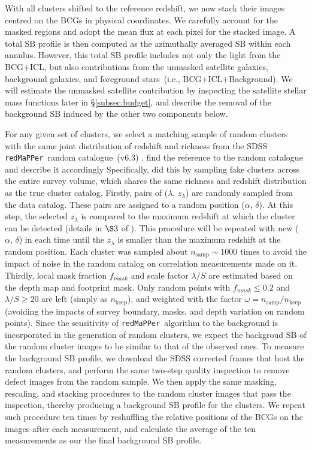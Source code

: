 \documentclass[fleqn,usenatbib]{mnras}
\newcommand\ying[1]{{\color{red} {#1}}}
\newcommand\xkchen[1]{{\color{cyan} {#1}}}
\newcommand\redmapper{\texttt{redMaPPer}}
\begin{document}
With all clusters shifted to the reference redshift, we now stack their
images centred on the BCGs in physical coordinates. We carefully account
for the masked regions and adopt the mean flux at each pixel for the
stacked image. A total SB profile is then computed as the azimuthally
averaged SB within each annulus. However, this total SB profile includes
not only the light from the BCG+ICL, but also contributions from the
unmasked satellite galaxies, background galaxies, and foreground
stars~(i.e., BCG+ICL+Background). We will estimate the unmasked satellite
contribution by inspecting the satellite stellar mass functions later in
\S\ref{subsec:budget}, and describe the removal of the background SB
induced by the other two components below.



For any given set of clusters, we select a matching sample of random
clusters with the same joint distribution of redshift and richness from the
SDSS \redmapper~random catalogue~(v6.3) \xkchen{\citep{Rykoff2016}}.\ying{find the reference to the
random catalogue and describe it accordingly} \xkchen{Specifically, \citep{Rykoff2016} did this by sampling fake clusters across the entire survey volume, which shares the same richness and redshift distribution as the true cluster catalog. Firstly, pairs of {($\lambda,\,z_{\lambda}$)} are randomly sampled from the data catalog. These pairs are assigned to a random position ($\alpha,\,\delta$). At this step, the selected $z_{\lambda}$ is compared to the maximum redshift at which the cluster can be detected (details in $\S3$ of \citep{Rykoff2016}). This procedure will be repeated with new ($\alpha,\,\delta$) in each time until the $z_{\lambda}$ is smaller than the maximum redshift at the random position. Each cluster was sampled about $n_{\mathrm{samp}}{\sim}1000$ times to avoid the impact of noise in the random catalog on correlation measurements made on it. Thirdly, local mask fraction $f_{mask}$ and scale factor $\lambda / S$ are estimated based on the depth map and footprint mask. Only random points with $f_{mask}\leq0.2$ and $\lambda / S \geq20$ are left (simply as $n_{\mathrm{keep}}$), and weighted with the factor $\omega=n_{\mathrm{samp}}/n_{\mathrm{keep}}$ (avoiding the impacts of survey boundary, masks, and depth variation on random points).}
Since the sensitivity of \redmapper~algorithm to the background is incorporated in the generation of
random clusters, we expect the backgroud SB of the random cluster images to
be similar to that of the observed ones. To measure the background SB
profile, we download the SDSS corrected frames that host the random
clusters, and perform the same two-step quality inspection to remove defect
images from the random sample. We then apply the same masking, rescaling,
and stacking procedures to the random cluster images that pass the
inspection, thereby producing a background SB profile for the clusters. We
repeat such procedure ten times by reshuffling the relative positions of
the BCGs on the images after each measurement, and calculate the average of
the ten measurements as our the final background SB profile.
\end{document}
